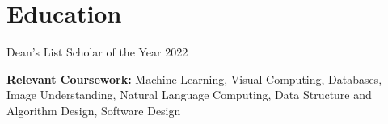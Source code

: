 \documentclass[11pt,a4paper,sans]{moderncv}        %
\begin{document}
\vspace*{-1.05mm}
\makecvtitle
\vspace*{-10mm}

\section{Education}


\vspace{-4pt}
Dean's List Scholar of the Year 2022

\vspace{3 pt}

{}{\textbf{Relevant Coursework:}}
%
Machine Learning, Visual Computing, Databases, Image Understanding, Natural Language Computing,
Data Structure and Algorithm Design, Software Design
\end{document}
